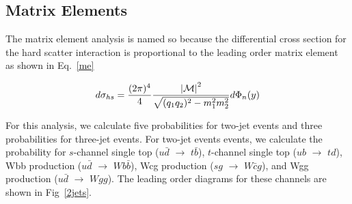 

\subsection{Matrix Elements}

The matrix element analysis is named so because the differential cross section for the hard scatter interaction is proportional to the leading order matrix element~\cite{PDG} as shown in Eq.~\ref{me}

\begin{equation}
\label{me}
d\sigma_{hs} = \frac{(2\pi)^4}{4} \frac{{|\cal M|}^{2}}{\sqrt{(q_{1}q_{2})^2 - m_{1}^2
m_{2}^2}} d\Phi_{n}(y)
\end{equation}

\noindent For this analysis, we calculate five probabilities for two-jet events and 
three probabilities for three-jet events. For two-jet events events, we
calculate the probability for $s$-channel single top ($u\bar{d}$ $\rightarrow$
$t\bar{b}$), $t$-channel single top ($ub$ $\rightarrow$ $td$), Wbb production
($u\bar{d}$ $\rightarrow$ $Wb\bar{b}$), Wcg production ($sg$ $\rightarrow$
$W\bar{c}g$), and Wgg production ($u\bar{d}$ $\rightarrow$ $Wgg$). The leading order diagrams for these channels are shown in Fig~\ref{2jets}.

